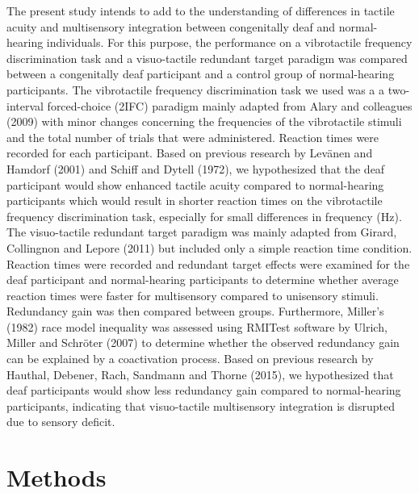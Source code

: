 \documentclass[12pt]{article}
\begin{document}
\par The present study intends to add to the understanding of differences in tactile acuity and multisensory integration between congenitally deaf and normal-hearing individuals. For this purpose, the performance on a vibrotactile frequency discrimination task and a visuo-tactile redundant target paradigm was compared between a congenitally deaf participant and a control group of normal-hearing participants. The vibrotactile frequency discrimination task we used was a a two-interval forced-choice (2IFC) paradigm mainly adapted from Alary and colleagues (2009) with minor changes concerning the frequencies of the vibrotactile stimuli and the total number of trials that were administered. Reaction times were recorded for each participant. Based on previous research by Levänen and Hamdorf (2001) and Schiff and Dytell (1972), we hypothesized that the deaf participant would show enhanced tactile acuity compared to normal-hearing participants which would result in shorter reaction times on the vibrotactile frequency discrimination task, especially for small  differences in frequency (Hz). The visuo-tactile redundant target paradigm was mainly adapted from Girard, Collingnon and Lepore (2011) but included only a simple reaction time condition. Reaction times were recorded and redundant target effects were examined for the deaf participant and normal-hearing participants to determine whether average reaction times were faster for multisensory compared to unisensory stimuli. Redundancy gain was then compared between groups. Furthermore, Miller’s (1982) race model inequality was assessed using RMITest software by Ulrich, Miller and Schröter (2007) to determine whether the observed redundancy gain can be explained by a coactivation process. Based on previous research by Hauthal, Debener, Rach, Sandmann and Thorne (2015), we hypothesized that deaf participants would show less redundancy gain compared to normal-hearing participants, indicating that visuo-tactile multisensory integration is disrupted due to sensory deficit.

\section{Methods}
\end{document}
